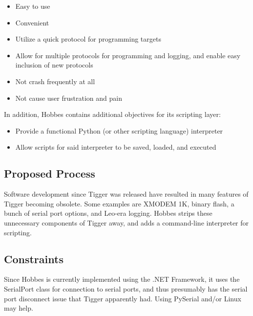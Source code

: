 \documentclass[12pt,letterpaper]{article}
\begin{document}
\begin{itemize}

\item Easy to use

\item Convenient

\item Utilize a quick protocol for programming targets

\item Allow for multiple protocols for programming and logging, and enable easy inclusion of new protocols

\item Not crash frequently at all

\item Not cause user frustration and pain

\end{itemize}

\noindent In addition, Hobbes contains additional objectives for its scripting layer:

\begin{itemize}

\item Provide a functional Python (or other scripting language) interpreter

\item Allow scripts for said interpreter to be saved, loaded, and executed

\end{itemize}



%
%
\subsection{Proposed Process}
\label{1.4}

Software development since Tigger was released have resulted in many features of Tigger becoming obsolete. Some examples are XMODEM 1K, binary flash, a bunch of serial port options, and Leo-era logging. Hobbes strips these unnecessary components of Tigger away, and adds a command-line interpreter for scripting.



%
%
\subsection{Constraints}
\label{1.5}

Since Hobbes is currently implemented using the .NET Framework, it uses the SerialPort class for connection to serial ports, and thus presumably has the serial port disconnect issue that Tigger apparently had. Using PySerial and/or Linux may help.
\end{document}
